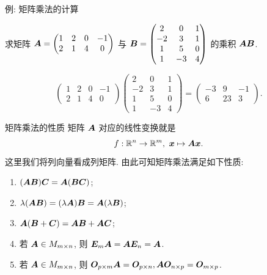\begin{frame}{例: 矩阵乘法的计算}
	\onslide<+->
	\begin{example}
		求矩阵 ${\boldsymbol{A}}=\begin{pmatrix}
			1&2&0&-1\\2&1&4&0
		\end{pmatrix}$ 与 ${\boldsymbol{B}}=\begin{pmatrix}
			2&0&1\\
			-2&3&1\\
			1&5&0\\
			1&-3&4
		\end{pmatrix}$ 的乘积 ${\boldsymbol{A}}{\boldsymbol{B}}$.
	\end{example}
	\onslide<+->
	\begin{solution}
		\[\begin{pmatrix}
			1&2&0&-1\\2&1&4&0
		\end{pmatrix}\begin{pmatrix}
			2&0&1\\
			-2&3&1\\
			1&5&0\\
			1&-3&4
		\end{pmatrix}=\begin{pmatrix}
			-3&9&-1\\
			6&23&3
		\end{pmatrix}.\]
	\end{solution}
\end{frame}


\begin{frame}{矩阵乘法的性质}
	\onslide<+->
	矩阵 ${\boldsymbol{A}}$ 对应的线性变换就是
	\[f:{\mathbb{R}}^n\to{\mathbb{R}}^m,\ {\boldsymbol{x}}\mapsto {\boldsymbol{A}}{\boldsymbol{x}}.\]
	这里我们将列向量看成列矩阵.
	\onslide<+->
	由此可知矩阵乘法满足如下性质:
	\begin{enumerate}
		\item $({\boldsymbol{A}}{\boldsymbol{B}}){\boldsymbol{C}}={\boldsymbol{A}}({\boldsymbol{B}}{\boldsymbol{C}})$;
		\item $\lambda({\boldsymbol{A}}{\boldsymbol{B}})=(\lambda{\boldsymbol{A}}){\boldsymbol{B}}={\boldsymbol{A}}(\lambda{\boldsymbol{B}})$;
		\item ${\boldsymbol{A}}({\boldsymbol{B}}+{\boldsymbol{C}})={\boldsymbol{A}}{\boldsymbol{B}}+{\boldsymbol{A}}{\boldsymbol{C}}$;
		\item 若 ${\boldsymbol{A}}\in M_{m\times n}$, 则 ${\boldsymbol{E}}_m {\boldsymbol{A}}={\boldsymbol{A}}{\boldsymbol{E}}_n={\boldsymbol{A}}$.
		\item 若 ${\boldsymbol{A}}\in M_{m\times n}$, 则 ${\boldsymbol{O}}_{p\times m} {\boldsymbol{A}}={\boldsymbol{O}}_{p\times n}, {\boldsymbol{A}}{\boldsymbol{O}}_{n\times p}={\boldsymbol{O}}_{m\times p}$.
	\end{enumerate}
\end{frame}


